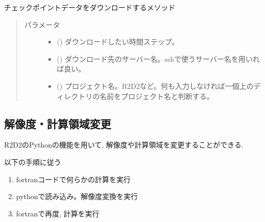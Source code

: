 \documentclass[letterpaper,10pt,dvipdfmx,report]{sphinxmanual}
\begin{document}
\begin{fulllineitems}
\label{\detokenize{io:R2D2.R2D2_data.sync_check}}
チェックポイントデータをダウンロードするメソッド
\begin{quote}\begin{description}
\item[{パラメータ}] \leavevmode\begin{itemize}
\item {} 
 () \sphinxhyphen{}\sphinxhyphen{} ダウンロードしたい時間ステップ。

\item {} 
 () \sphinxhyphen{}\sphinxhyphen{} ダウンロード先のサーバー名。sshで使うサーバー名を用いれば良い。

\item {} 
 () \sphinxhyphen{}\sphinxhyphen{} プロジェクト名。\textquotesingle{}R2D2\textquotesingle{}など。何も入力しなければ一個上のディレクトリの名前をプロジェクト名と判断する。

\end{itemize}

\end{description}\end{quote}

\end{fulllineitems}



\subsection{解像度・計算領域変更}
\label{\detokenize{io:id7}}
R2D2のPythonの機能を用いて, 解像度や計算領域を変更することができる.

以下の手順に従う
\begin{enumerate}
%
\item {} 
fortranコードで何らかの計算を実行

\item {} 
pythonで読み込み。解像度変換を実行

\item {} 
fortranで再度, 計算を実行

\end{enumerate}
\end{document}
